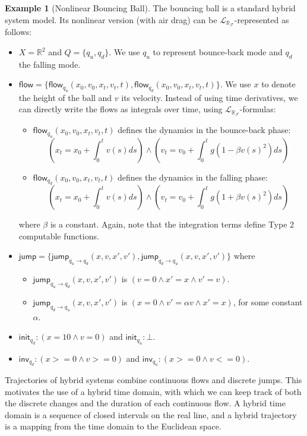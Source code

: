 \documentclass[10pt]{article}
\theoremstyle{plain}
\theoremstyle{definition}
\newtheorem{example}[theorem]{Example}
\newcommand{\flow}{\mathsf{flow}}
\newcommand{\jump}{\mathsf{jump}}
\newcommand{\inv}{\mathsf{inv}}
\newcommand{\init}{\mathsf{init}}
\newcommand{\lrf}{\mathcal{L}_{\mathbb{R}_{\mathcal{F}}}}
\begin{document}
\begin{example}[Nonlinear Bouncing Ball]
The bouncing ball is a standard hybrid system model. Its nonlinear version (with air drag) can be $\lrf$-represented as follows:
\begin{itemize}
\item $X = \mathbb{R}^2$ and $Q = \{q_u, q_d\}$. We use $q_u$ to represent bounce-back mode and $q_d$ the falling mode.
\item $\flow = \{\flow_{q_u}(x_0, v_0, x_t, v_t, t), \flow_{q_d}(x_0, v_0, x_t, v_t, t)\}$. We use $x$ to denote the height of the ball and $v$ its velocity. Instead of using time derivatives, we can directly write the flows as integrals over time, using $\lrf$-formulas:
\begin{itemize}
\item $\flow_{q_u}(x_0, v_0, x_t, v_t, t)$ defines the dynamics in the bounce-back phase:
$$(x_t = x_0 + \int_0^{t} v(s) ds) \wedge (v_t = v_0 + \int_0^t g(1-\beta v(s)^2) ds)$$
\item $\flow_{q_d}(x_0, v_0, x_t, v_t, t)$ defines the dynamics in the falling phase:
$$(x_t = x_0 + \int_0^{t} v(s) ds) \wedge (v_t = v_0 + \int_0^t g(1+\beta v(s)^2) ds)$$
\end{itemize}where
$\beta$ is a constant. Again, note that the integration terms define Type 2 computable functions.
\item $\jump = \{\jump_{q_u \rightarrow q_d} (x, v, x', v'), \jump_{q_d \rightarrow q_u} (x, v, x', v')\}$ where
\begin{itemize}
 \item $\jump_{q_u \rightarrow q_d} (x, v, x', v')$ is $(v= 0 \wedge x' = x \wedge v' = v)$.
\item $\jump_{q_d \rightarrow q_u} (x, v, x', v')$ is $(x= 0 \wedge v' = \alpha v\wedge x'=x)$,  for some constant $\alpha$.
\end{itemize}
\vspace{0.1cm}
\item $\init_{q_d}: (x=10 \wedge v=0)$ and $\init_{q_u}: \bot$.
\item $\inv_{q_d}: (x>=0 \wedge v>=0)$ and $\inv_{q_u}: (x>=0 \wedge v<=0)$.
\end{itemize}
\end{example}

Trajectories of hybrid systems combine continuous flows and discrete jumps. This motivates the use of a hybrid time domain, with which we can keep track of both the discrete changes and the duration of each continuous flow. A hybrid time domain is a sequence of closed intervals on the real line, and a hybrid trajectory is a mapping from the time domain to the Euclidean space. 
\end{document}
